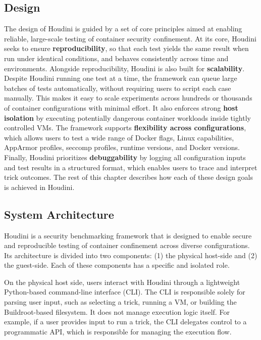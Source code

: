 \fontsize{12pt}{14pt} \selectfont
\begin{doublespace}
\chapter{Design}

The design of Houdini is guided by a set of core principles aimed at enabling reliable, large-scale testing of container security confinement. At its core, Houdini seeks to ensure \textbf{reproducibility}, so that each test yields the same result when run under identical conditions, and behaves consistently across time and environments. Alongside reproducibility, Houdini is also built for \textbf{scalability}. Despite Houdini running one test at a time, the framework can queue large batches of tests automatically, without requiring users to script each case manually. This makes it easy to scale experiments across hundreds or thousands of container configurations with minimal effort. It also enforces strong \textbf{host isolation} by executing potentially dangerous container workloads inside tightly controlled VMs. The framework supports \textbf{flexibility across configurations}, which allows users to test a wide range of Docker flags, Linux capabilities, AppArmor profiles, seccomp profiles, runtime versions, and Docker versions. Finally, Houdini prioritizes \textbf{debuggability} by logging all configuration inputs and test results in a structured format, which enables users to trace and interpret trick outcomes. The rest of this chapter describes how each of these design goals is achieved in Houdini.



\section{System Architecture}
Houdini is a security benchmarking framework that is designed to enable secure and reproducible testing of container confinement across diverse configurations. Its architecture is divided into two components: (1) the physical host-side and (2) the guest-side. Each of these components has a specific and isolated role.

On the physical host side, users interact with Houdini through a lightweight Python-based command-line interface (CLI). The CLI is responsible solely for parsing user input, such as selecting a trick, running a VM, or building the Buildroot-based filesystem. It does not manage execution logic itself. For example, if a user provides input to run a trick, the CLI delegates control to a programmatic API, which is responsible for managing the execution flow.


\end{doublespace}
